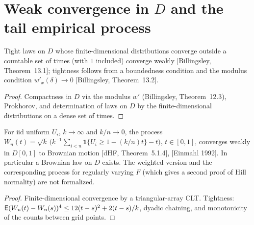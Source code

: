\section{\texorpdfstring{Weak convergence in $D$ and the tail empirical process}{Weak convergence in D and the tail empirical process}}

\begin{theorem}
  \label{thm:skorokhod-weak-convergence}
  \leanok
  Tight laws on $D$ whose finite-dimensional distributions converge outside a countable set of times (with $1$ included)
  converge weakly [Billingsley, Theorem~13.1]; tightness follows from a boundedness condition and the modulus condition
  $w'_x(\delta) \to 0$ [Billingsley, Theorem~13.2].
\end{theorem}
\begin{proof}
  \leanok
  Compactness in $D$ via the modulus $w'$ (Billingsley, Theorem~12.3), Prokhorov, and determination of laws on $D$ by the
  finite-dimensional distributions on a dense set of times.
\end{proof}

\begin{theorem}
  \label{thm:tail-empirical-process}
  \leanok
  For iid uniform $U_i$, $k \to \infty$ and $k/n \to 0$, the process
  $W_n(t) = \sqrt k\,\big(k^{-1}\sum_{i<n} \mathbf 1\{U_i \ge 1 - (k/n)t\} - t\big)$, $t \in [0,1]$, converges weakly in $D[0,1]$ to Brownian
  motion [dHF, Theorem~5.1.4], [Einmahl 1992]. In particular a Brownian law on $D$ exists. The weighted version and the
  corresponding process for regularly varying $F$ (which gives a second proof of Hill normality) are not formalized.
\end{theorem}
\begin{proof}
  \leanok
  Finite-dimensional convergence by a triangular-array CLT. Tightness: $\mathsf{E}(W_n(t) - W_n(s))^4 \le 12(t-s)^2 + 2(t-s)/k$,
  dyadic chaining, and monotonicity of the counts between grid points.
\end{proof}
